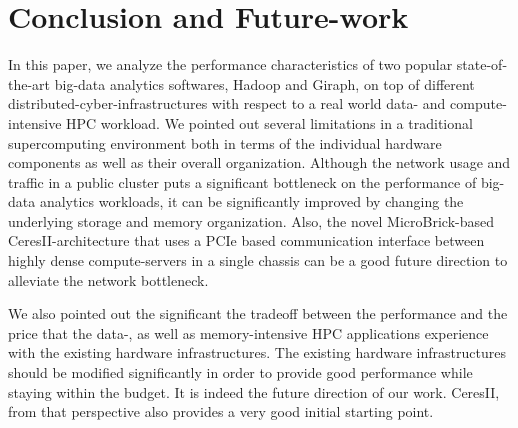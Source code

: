 \documentclass[conference]{IEEEtran}
\begin{document}

\section {Conclusion and Future-work} \label{conclusion}
In this paper, we analyze the performance characteristics of two popular state-of-the-art big-data analytics softwares, Hadoop and Giraph, on top of different distributed-cyber-infrastructures with respect to a real world data- and compute-intensive HPC workload.
We pointed out several limitations in a traditional supercomputing environment both in terms of the individual hardware components as well as their overall organization.
Although the network usage and traffic in a public cluster puts a significant bottleneck on the performance of big-data analytics workloads, it can be significantly improved by changing the underlying storage and memory organization.
Also, the novel MicroBrick-based CeresII-architecture that uses a PCIe based communication interface between highly dense compute-servers in a single chassis can be a good future direction to alleviate the network bottleneck.

We also pointed out the significant the tradeoff between the performance and the price that the data-, as well as memory-intensive HPC applications experience with the existing hardware infrastructures.  
The existing hardware infrastructures should be modified significantly in order to provide good performance while staying within the budget. 
It is indeed the future direction of our work.
CeresII, from that perspective also provides a very good initial starting point.
\end{document}
